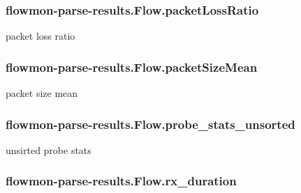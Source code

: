 \subsubsection[{\texorpdfstring{packet\+Loss\+Ratio}{packetLossRatio}}]{\setlength{\rightskip}{0pt plus 5cm}flowmon-\/parse-\/results.\+Flow.\+packet\+Loss\+Ratio}\hypertarget{classflowmon-parse-results_1_1Flow_a644d64afcdc8e8ce9043c416c1257653}{}\label{classflowmon-parse-results_1_1Flow_a644d64afcdc8e8ce9043c416c1257653}


packet loss ratio 

\subsubsection[{\texorpdfstring{packet\+Size\+Mean}{packetSizeMean}}]{\setlength{\rightskip}{0pt plus 5cm}flowmon-\/parse-\/results.\+Flow.\+packet\+Size\+Mean}\hypertarget{classflowmon-parse-results_1_1Flow_a4989e2cc50c300a39cde6bb977e00e5f}{}\label{classflowmon-parse-results_1_1Flow_a4989e2cc50c300a39cde6bb977e00e5f}


packet size mean 

\subsubsection[{\texorpdfstring{probe\+\_\+stats\+\_\+unsorted}{probe_stats_unsorted}}]{\setlength{\rightskip}{0pt plus 5cm}flowmon-\/parse-\/results.\+Flow.\+probe\+\_\+stats\+\_\+unsorted}\hypertarget{classflowmon-parse-results_1_1Flow_ada58349bc1acdf422a8421e527030dc5}{}\label{classflowmon-parse-results_1_1Flow_ada58349bc1acdf422a8421e527030dc5}


unsirted probe stats 

\subsubsection[{\texorpdfstring{rx\+\_\+duration}{rx_duration}}]{\setlength{\rightskip}{0pt plus 5cm}flowmon-\/parse-\/results.\+Flow.\+rx\+\_\+duration}\hypertarget{classflowmon-parse-results_1_1Flow_ab082f1677744e57e7e2cf7b23b589dc8}{}\label{classflowmon-parse-results_1_1Flow_ab082f1677744e57e7e2cf7b23b589dc8}


